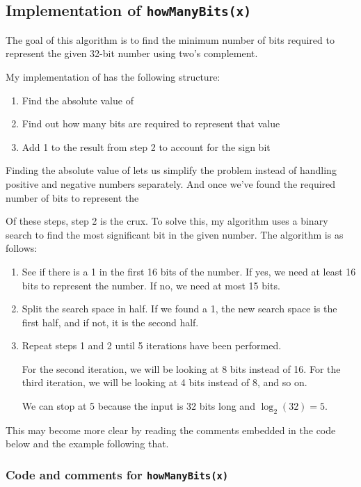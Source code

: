 \subsection{Implementation of \texttt{howManyBits(x)}}

The goal of this algorithm is to find the minimum number of bits required to represent the given 32-bit number using two's complement.

My implementation of  has the following structure:

\begin{enumerate}
  \item Find the absolute value of 
  \item Find out how many bits are required to represent that value
  \item Add 1 to the result from step 2 to account for the sign bit
\end{enumerate}

Finding the absolute value of  lets us simplify the problem instead of handling positive and negative numbers separately. And once we've found the required number of bits to represent the 

Of these steps, step 2 is the crux. To solve this, my algorithm uses a binary search to find the most significant bit in the given number. The algorithm is as follows:

\begin{enumerate}
  \item See if there is a 1 in the first 16 bits of the number. If yes, we need at least 16 bits to represent the number. If no, we need at most 15 bits.
  \item Split the search space in half. If we found a 1, the new search space is the first half, and if not, it is the second half.
  \item Repeat steps 1 and 2 until 5 iterations have been performed.

    For the second iteration, we will be looking at 8 bits instead of 16. For the third iteration, we will be looking at 4 bits instead of 8, and so on.

    We can stop at 5 because the input is 32 bits long and $\log_2(32) = 5$.
\end{enumerate}

This may become more clear by reading the comments embedded in the code below and the example following that.

\subsubsection{Code and comments for \texttt{howManyBits(x)}}

